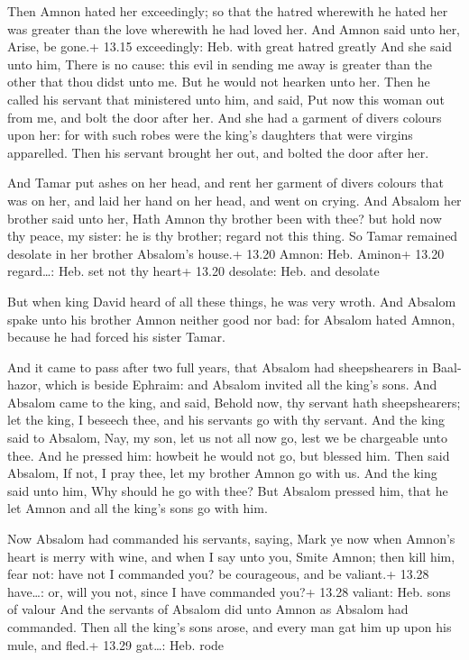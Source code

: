  Then Amnon hated her exceedingly; so that the hatred
wherewith he hated her was greater than the love wherewith he had loved
her. And Amnon said unto her, Arise, be gone.+ 13.15 exceedingly: Heb.
with great hatred greatly  And she said unto him, There is
no cause: this evil in sending me away is greater than the other that
thou didst unto me. But he would not hearken unto her. 
Then he called his servant that ministered unto him, and said, Put now
this woman out from me, and bolt the door after her.  And
she had a garment of divers colours upon her: for with such robes were
the king's daughters that were virgins apparelled. Then his servant
brought her out, and bolted the door after her.

 And Tamar put ashes on her head, and rent her garment of
divers colours that was on her, and laid her hand on her head, and went
on crying.  And Absalom her brother said unto her, Hath
Amnon thy brother been with thee? but hold now thy peace, my sister: he
is thy brother; regard not this thing. So Tamar remained desolate in her
brother Absalom's house.+ 13.20 Amnon: Heb. Aminon+ 13.20 regard\ldots:
Heb. set not thy heart+ 13.20 desolate: Heb. and desolate

 But when king David heard of all these things, he was
very wroth.  And Absalom spake unto his brother Amnon
neither good nor bad: for Absalom hated Amnon, because he had forced his
sister Tamar.

 And it came to pass after two full years, that Absalom
had sheepshearers in Baal-hazor, which is beside Ephraim: and Absalom
invited all the king's sons.  And Absalom came to the king,
and said, Behold now, thy servant hath sheepshearers; let the king, I
beseech thee, and his servants go with thy servant.  And
the king said to Absalom, Nay, my son, let us not all now go, lest we be
chargeable unto thee. And he pressed him: howbeit he would not go, but
blessed him.  Then said Absalom, If not, I pray thee, let
my brother Amnon go with us. And the king said unto him, Why should he
go with thee?  But Absalom pressed him, that he let Amnon
and all the king's sons go with him.

 Now Absalom had commanded his servants, saying, Mark ye
now when Amnon's heart is merry with wine, and when I say unto you,
Smite Amnon; then kill him, fear not: have not I commanded you? be
courageous, and be valiant.+ 13.28 have\ldots: or, will you not, since I
have commanded you?+ 13.28 valiant: Heb. sons of valour 
And the servants of Absalom did unto Amnon as Absalom had commanded.
Then all the king's sons arose, and every man gat him up upon his mule,
and fled.+ 13.29 gat\ldots: Heb. rode

